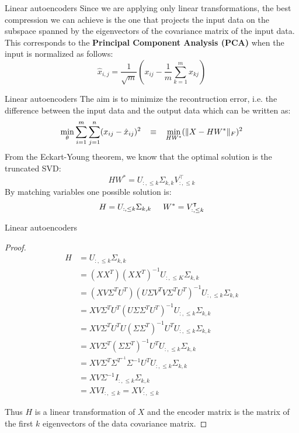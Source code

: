 \documentclass[9pt]{beamer}
\begin{document}
\begin{frame}{Linear autoencoders}
Since we are applying only linear transformations, the best compression we can achieve is the one that projects the input data on the subspace spanned by the eigenvectors of the covariance matrix of the input data.\\
\vspace{1cm}
This corresponds to the \textbf{Principal Component Analysis (PCA)} when the input is normalized as follows:
\[
    \hat{x}_{i,j} = \dfrac{1}{\sqrt{m}}\left(x_{ij} - \dfrac{1}{m}\sum_{k=1}^m x_{kj}\right)
\]      
\end{frame}


\begin{frame}{Linear autoencoders}
    The aim is to minimize the recontruction error, i.e. the difference between the input data and the output data which can be written as:
    \[
        \min_{\theta} \sum_{i=1}^m \sum_{j=1}^n (x_{ij} - \hat{x}_{ij})^2 \hspace{0.3cm} \equiv \hspace{0.3cm} \min_{HW^*} (\|X - HW^*\|_F)^2
    \]
    From the Eckart-Young theorem, we know that the optimal solution is the truncated SVD:
\[
    HW^* = U_{:,\leq k}\Sigma_{k,k}V_{:,\leq k}^\intercal
\]
By matching variables one possible solution is:
\[
    H = U_{:,\leq k}\Sigma_{k,k} \hspace{0.5cm} W^* = V_{:,\leq k}^\intercal
\]
\end{frame}


\begin{frame}{Linear autoencoders}
\begin{proof}
    \begin{align*}
        H &= U_{:,\leq k}\Sigma_{k,k} \\
        &= (XX^T)(XX^T)^{-1}U_{:,\leq K}\Sigma_{k,k} \\
        &= (XV\Sigma^T U^T)(U\Sigma V^T V\Sigma^T U^T)^{-1}U_{:,\leq k}\Sigma_{k,k} \\
        &= XV\Sigma^T U^T(U\Sigma\Sigma^T U^T)^{-1}U_{:,\leq k}\Sigma_{k,k} \\
        &= XV\Sigma^T U^T U(\Sigma\Sigma^T)^{-1}U^T U_{:,\leq k}\Sigma_{k,k} \\
        &= XV\Sigma^T (\Sigma\Sigma^T)^{-1}U^T U_{:,\leq k}\Sigma_{k,k} \\
        &= XV\Sigma^T \Sigma^{T^{-1}}\Sigma^{-1}U^T U_{:,\leq k}\Sigma_{k,k}\\
        &= XV\Sigma^{-1} I_{:,\leq k}\Sigma_{k,k}\\
        &= XV I_{:,\leq k} = XV_{:,\leq k}
        \end{align*}
    
        Thus $H$ is a linear transformation of $X$ and the encoder matrix is the matrix of the first $k$ eigenvectors of the data covariance matrix. 
\end{proof}
\end{frame}
\end{document}
